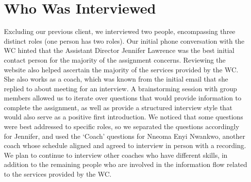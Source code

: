 \documentclass[12pt]{article} %
\begin{document}
\section{Who Was Interviewed} %
  Excluding our previous client, we interviewed two people, encompassing three distinct roles (one person has two roles).
  Our initial phone conversation with the WC hinted that the Assistant Director Jennifer Lawrence was the best initial contact person for the majority of the assignment concerns.
  Reviewing the website also helped ascertain the majority of the services provided by the WC.
  She also works as a coach, which was known from the initial email that she replied to about meeting for an interview.
  A brainstorming session with group members allowed us to iterate over questions that would provide information to complete the assignment, as well as provide a structured interview style that would also serve as a positive first introduction.
  We noticed that some questions were best addressed to specific roles, so we separated the questions accordingly for Jennifer, and used the `Coach' questions for Nneoma Enyi Nwankwo, another coach whose schedule aligned and agreed to interview in person with a recording.
  We plan to continue to interview other coaches who have different skills, in addition to the remaining people who are involved in the information flow related to the services provided by the WC.
\end{document}

